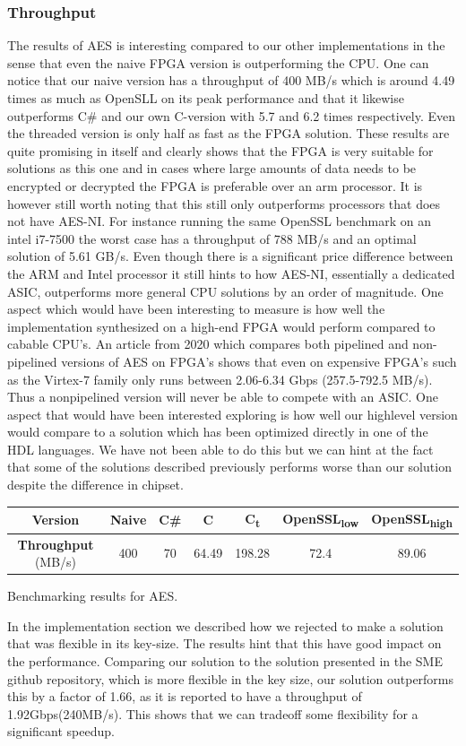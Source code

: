 \documentclass[a4paper]{article}
\begin{document}
\subsubsection{Throughput}
\label{sec:orgfcc8bc4}
The results of AES is interesting compared to our other implementations in the sense that even the naive FPGA version is outperforming the CPU. One can notice that our naive version has a throughput of 400 MB/s which is around 4.49 times as much as OpenSLL on its peak performance and that it likewise outperforms C\# and our own C-version with 5.7 and 6.2 times respectively. Even the threaded version is only half as fast as the FPGA solution. These results are quite promising in itself and clearly shows that the FPGA is very suitable for solutions as this one and in cases where large amounts of data needs to be encrypted or decrypted the FPGA is preferable over an arm processor. It is however still worth noting that this still only outperforms processors that does not have AES-NI. For instance running the same OpenSSL benchmark on an intel i7-7500 the worst case has a throughput of 788 MB/s and an optimal solution of 5.61 GB/s. Even though there is a significant price difference between the ARM and Intel processor it still hints to how AES-NI, essentially a dedicated ASIC, outperforms more general CPU solutions by an order of magnitude. One aspect which would have been interesting to measure is how well the implementation synthesized on a high-end FPGA would perform compared to cabable CPU's. An article from 2020 which compares both pipelined and non-pipelined versions of AES on FPGA's shows that even on expensive FPGA's such as the Virtex-7 family only runs between 2.06-6.34 Gbps (257.5-792.5 MB/s)\cite{FPGA_AES}. Thus a nonpipelined version will never be able to compete with an ASIC. One aspect that would have been interested exploring is how well our highlevel version would compare to a solution which has been optimized directly in one of the HDL languages. We have not been able to do this but we can hint at the fact that some of the solutions described previously performs worse than our solution despite the difference in chipset.
\begin{table}[htbp]
\centering
\begin{tabular}{|c|c|c|c|c|c|c|}
\hline
\textbf{Version} & Naive & C\# & C & C\textsubscript{t} & OpenSSL\textsubscript{low} & OpenSSL\textsubscript{high}\\
\hline
\textbf{Throughput} (MB/s) & 400 & 70 & 64.49 & 198.28 & 72.4 & 89.06\\
\hline
\end{tabular}
Benchmarking results for AES.

\end{table}
In the implementation section we described how we rejected to make a solution that was flexible in its key-size. The results hint that this have good impact on the performance. Comparing our solution to the solution presented in the SME github repository, which is more flexible in the key size, our solution outperforms this by a factor of 1.66, as it is reported to have a throughput of 1.92Gbps(240MB/s)\cite{sme}. This shows that we can tradeoff some flexibility for a significant speedup.
\end{document}
